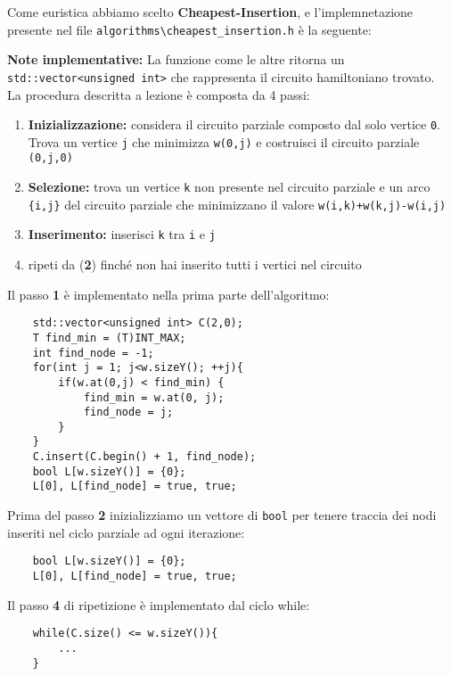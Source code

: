 \documentclass[]{article}
\begin{document}
\begin{flushleft}
Come euristica abbiamo scelto \textbf{Cheapest-Insertion}, e l'implemnetazione presente nel file \verb|algorithms\cheapest_insertion.h| è la seguente:
\lstset{language=c++, style=mystyle}


\textbf{Note implementative:}
La funzione come le altre ritorna un \verb|std::vector<unsigned int>| che rappresenta il circuito hamiltoniano trovato.\\
La procedura descritta a lezione è composta da 4 passi:
\begin{enumerate}
\item \textbf{Inizializzazione:} considera il circuito parziale composto dal solo vertice \verb|0|. Trova un vertice \verb|j| che minimizza \verb|w(0,j)| e costruisci il circuito parziale \verb|(0,j,0)|
\item \textbf{Selezione:} trova un vertice \verb|k| non presente nel circuito parziale e un arco \verb|{i,j}| del circuito parziale che minimizzano il valore \verb|w(i,k)+w(k,j)-w(i,j)|
\item \textbf{Inserimento:} inserisci \verb|k| tra \verb|i| e \verb|j|
\item ripeti da (\textbf{2}) finché non hai inserito tutti i vertici nel circuito
\end{enumerate}
Il passo \textbf{1} è implementato nella prima parte dell'algoritmo:
\lstset{language=c++, style=mystyle, firstnumber=2}
\begin{lstlisting}
    std::vector<unsigned int> C(2,0);
    T find_min = (T)INT_MAX;
    int find_node = -1;
    for(int j = 1; j<w.sizeY(); ++j){
        if(w.at(0,j) < find_min) {
            find_min = w.at(0, j);
            find_node = j;
        }
    }
    C.insert(C.begin() + 1, find_node);
    bool L[w.sizeY()] = {0};
    L[0], L[find_node] = true, true;
\end{lstlisting}
Prima del passo \textbf{2} inizializziamo un vettore di \verb|bool| per tenere traccia dei nodi inseriti nel ciclo parziale ad ogni iterazione:
\lstset{language=c++, style=mystyle, firstnumber=12}
\begin{lstlisting}
    bool L[w.sizeY()] = {0};
    L[0], L[find_node] = true, true;
\end{lstlisting}
Il passo \textbf{4} di ripetizione è implementato dal ciclo while:
\lstset{language=c++, style=mystyle, firstnumber=14}
\begin{lstlisting}
    while(C.size() <= w.sizeY()){
   	    ...    
    }
\end{lstlisting}

\end{flushleft}
\end{document}
